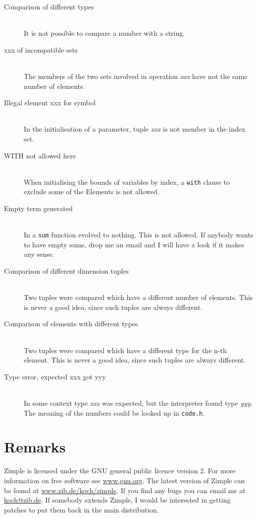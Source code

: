 \documentclass[12pt]{article}
\newcommand{\zimple}{{\sc Zimple}\xspace}
\newcommand{\code}[1]{{\tt #1}\xspace}
\begin{document}
\begin{description}
\item[Comparison of different types]\ \\
 It is not possible to compare a number with a string.
\item[xxx of incompatible sets]\ \\
 The members of the two sets involved in operation \emph{xxx} have not
 the same number of elements.
\item[Illegal element xxx for symbol]\ \\
 In the initialisation of a parameter, tuple \emph{xxx} is not member
 in the index set.
\item[WITH not allowed here]\ \\
 When initialising the bounds of variables by index, 
 a \code{with} clause to exclude some of the Elements is not allowed.
\item[Empty term generated]\ \\
 In a \code{sum} function evolved to nothing. This is not allowed.
 If anybody wants to have empty sums, drop me an email and I will
 have a look if it makes any sense.
\item[Comparison of different dimension tuples]\ \\
 Two tuples were compared which have a different number of elements.
 This is never a good idea, since such tuples are always different.
\item[Comparison of elements with different types]\ \\
 Two tuples were compared which have a different type for the 
 n-th element. 
 This is never a good idea, since such tuples are always different.
\item[Type error, expected xxx got yyy]\ \\
 In some context type \emph{xxx} was expected, but the interpreter
 found type \emph{yyy}. The meaning of the numbers could be looked up
 in \code{code.h}.
\end{description}

\section{Remarks}
\zimple is licensed under the GNU general public licence version 2.
For more information on free software see \url{www.gnu.org}.
The latest version of \zimple can be found at
\url{www.zib.de/koch/zimple}.
If you find any bugs you can email me at \url{koch@zib.de}.
If somebody extends \zimple, I would be interested in getting patches
to put them back in the main distribution.
 



{\vfill\tiny\hfill\fbox{\rcsInfoRevision}}
\end{document}
